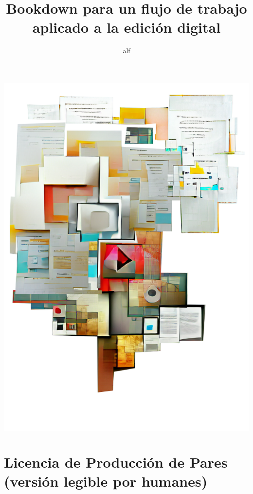 \documentclass[
]{book}
\title{Bookdown para un flujo de trabajo aplicado a la edición digital}
\author{alf}
\date{}
\begin{document}
\maketitle

{
\setcounter{tocdepth}{1}
\tableofcontents
}
\hypertarget{section}{%
\chapter*{}\label{section}}

\includegraphics{images/portada.png}

\hypertarget{licencias}{%
\chapter*{Licencia de Producción de Pares (versión legible por humanes)}\label{licencias}}
\end{document}

